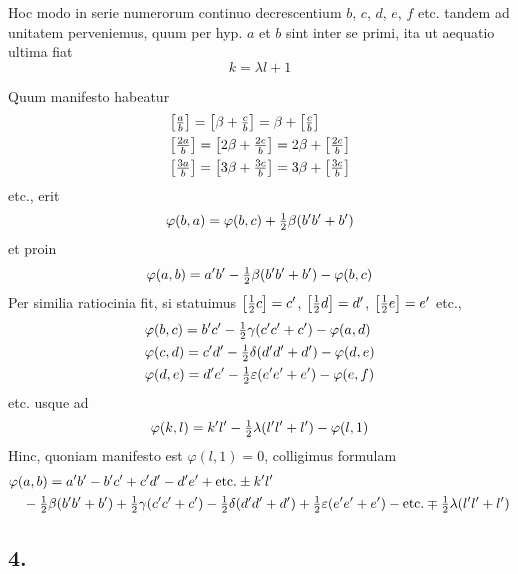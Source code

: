 \documentclass[twoside,12pt, showframe]{memoir}
\let\oldfrac\frac
\def\frac#1#2{\mathchoice{\tfrac{#1}{#2}}{\oldfrac{#1}{#2}}{\genfrac{}{}{}{2}{#1}{#2\mathstrut}}{\genfrac{}{}{}{3}{#1}{#2\mathstrut}}}
\begin{document}
Hoc modo in serie numerorum continuo decrescentium \(b\), \(c\), \(d\), \(e\), \(f\) etc. tandem ad unitatem perveniemus, quum per hyp. \(a\) et \(b\) sint inter se primi, ita ut aequatio ultima fiat
\[k=\lambda l+1\]

Quum manifesto habeatur
\[\begin{aligned}
& {\left[\frac{a}{b}\right]=\left[\beta+\frac{c}{b}\right]=\beta+\left[\frac{c}{b}\right]} \\
& {\left[\frac{2 a}{b}\right]=\left[2 \beta+\frac{2 c}{b}\right]=2 \beta+\left[\frac{2 c}{b}\right]} \\
& {\left[\frac{3 a}{b}\right]=\left[3 \beta+\frac{3 c}{b}\right]=3 \beta+\left[\frac{3 c}{b}\right]}
\end{aligned}\]
etc., erit
\[\varphi(b, a)=\varphi(b, c)+\frac{1}{2} \beta (b^{\prime} b^{\prime}+b^{\prime})\]
et proin
\[\varphi(a, b)=a^{\prime} b^{\prime}-\frac{1}{2} \beta (b^{\prime} b^{\prime}+b^{\prime})-\varphi(b, c)\]
Per similia ratiocinia fit, si statuimus \(\left[\frac{1}{2} c\right]=c^{\prime}\), \(\left[\frac{1}{2} d\right]=d^{\prime}\), \(\left[\frac{1}{2} e\right]=e^{\prime}\) etc.,
\[\begin{aligned}
& \varphi(b, c)=b^{\prime} c^{\prime}-\frac{1}{2} \gamma(c^{\prime} c^{\prime}+c^{\prime})-\varphi(a, d) \\
& \varphi(c, d)=c^{\prime} d^{\prime}-\frac{1}{2} \delta(d^{\prime} d^{\prime}+d^{\prime})-\varphi(d, e) \\
& \varphi(d, e)=d^{\prime} e^{\prime}-\frac{1}{2} \varepsilon(e^{\prime} e^{\prime}+e^{\prime})-\varphi(e, f)
\end{aligned}\]
etc. usque ad
\[\varphi(k, l)=k^{\prime} l^{\prime}-\frac{1}{2} \lambda(l^{\prime} l^{\prime}+l^{\prime})-\varphi(l, 1)\]
Hinc, quoniam manifesto est \(\varphi(l, 1)=0\), colligimus formulam
\[\begin{aligned}
& \varphi(a, b)=a^{\prime} b^{\prime}-b^{\prime} c^{\prime}+c^{\prime} d^{\prime}-d^{\prime} e^{\prime}+\text{etc.} \pm k^{\prime} l^{\prime} \\
& \quad-\frac{1}{2} \beta (b^{\prime} b^{\prime}+b^{\prime})+\frac{1}{2} \gamma(c^{\prime} c^{\prime}+c^{\prime})-\frac{1}{2} \delta(d^{\prime} d^{\prime}+d^{\prime})+\frac{1}{2} \varepsilon(e^{\prime} e^{\prime}+e^{\prime})-\text{etc.} \mp \frac{1}{2} \lambda(l^{\prime} l^{\prime}+l^{\prime})
\end{aligned}\]

\subsection*{4.}
 
\end{document}
